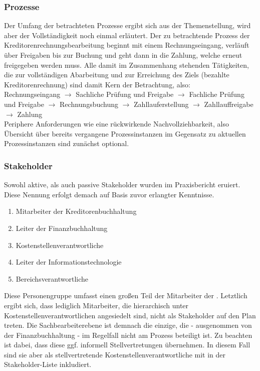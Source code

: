 \subsubsection{Prozesse}
Der Umfang der betrachteten Prozesse ergibt sich aus der Themenstellung, wird aber der Vollständigkeit noch einmal erläutert.
Der zu betrachtende Prozess der Kreditorenrechnungsbearbeitung beginnt mit einem Rechnungseingang, verläuft über Freigaben bis zur Buchung und geht dann in die Zahlung, welche erneut freigegeben werden muss.
Alle damit im Zusammenhang stehenden Tätigkeiten, die zur vollständigen Abarbeitung und zur Erreichung des Ziels (bezahlte Kreditorenrechnung) sind damit Kern der Betrachtung, also:
\\[1\baselineskip]
Rechnungseingang $\rightarrow$ Sachliche Prüfung und Freigabe $\rightarrow$ Fachliche Prüfung und Freigabe $\rightarrow$ Rechnungsbuchung $\rightarrow$ Zahllauferstellung $\rightarrow$ Zahllauffreigabe $\rightarrow$ Zahlung
\\[1\baselineskip]
Periphere Anforderungen wie eine rückwirkende Nachvollziehbarkeit, also Übersicht über bereits vergangene Prozessinstanzen im Gegensatz zu aktuellen Prozessinstanzen sind zunächst optional.


\subsubsection{Stakeholder}
Sowohl aktive, als auch passive Stakeholder wurden im Praxisbericht eruiert.
Diese Nennung erfolgt demach auf Basis zuvor erlangter Kenntnisse.
\begin{enumerate}
\setlength\itemsep{-0.2em}
\item{Mitarbeiter der Kreditorenbuchhaltung}
\item{Leiter der Finanzbuchhaltung}
\item{Kostenstellenverantwortliche}
\item{Leiter der Informationstechnologie}
\item{Bereichsverantwortliche}
\end{enumerate}
Diese Personengruppe umfasst einen großen Teil der Mitarbeiter der \firma.
Letztlich ergibt sich, dass lediglich Mitarbeiter, die hierarchisch unter Kostenstellenverantwortlichen angesiedelt sind, nicht als Stakeholder auf den Plan treten.
Die Sachbearbeiterebene ist demnach die einzige, die - ausgenommen von der Finanzbuchhaltung - im Regelfall nicht am Prozess beteiligt ist.
Zu beachten ist dabei, dass diese ggf. informell Stellvertretungen übernehmen.
In diesem Fall sind sie aber als stellvertretende Kostenstellenverantwortliche mit in der Stakeholder-Liste inkludiert.

